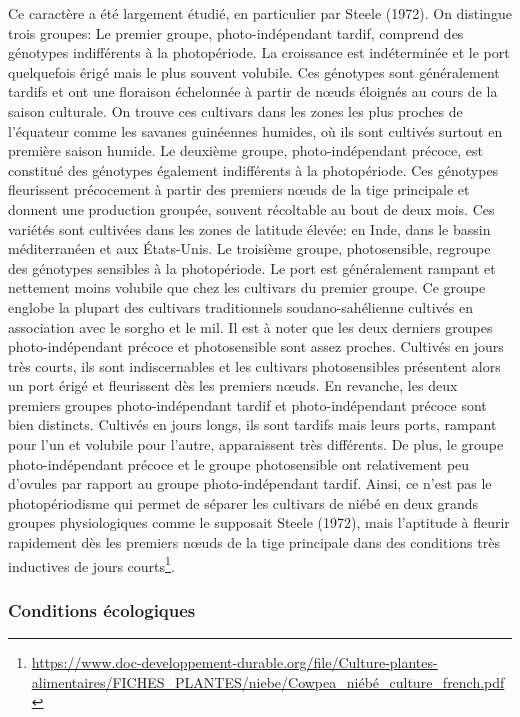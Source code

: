 \documentclass[a4paper,11pt]{article}
\begin{document}
Ce caractère a été largement étudié, en particulier par Steele
(1972). On distingue trois groupes: Le premier groupe,
photo-indépendant tardif, comprend des génotypes indifférents à la
photopériode. La croissance est indéterminée et le port quelquefois
érigé mais le plus souvent volubile. Ces génotypes sont généralement
tardifs et ont une floraison échelonnée à partir de nœuds éloignés au
cours de la saison culturale. On trouve ces cultivars dans les zones
les plus proches de l’équateur comme les savanes guinéennes humides,
où ils sont cultivés surtout en première saison humide.  Le
deuxième groupe, photo-indépendant précoce, est constitué des
génotypes également indifférents à la photopériode. Ces génotypes
fleurissent précocement à partir des premiers nœuds de la tige
principale et donnent une production groupée, souvent récoltable au
bout de deux mois. Ces variétés sont cultivées dans les zones de
latitude élevée: en Inde, dans le bassin méditerranéen et aux
États-Unis.  Le troisième groupe, photosensible, regroupe des
génotypes sensibles à la photopériode. Le port est généralement
rampant et nettement moins volubile que chez les cultivars du premier
groupe. Ce groupe englobe la plupart des cultivars traditionnels
soudano-sahélienne cultivés en association avec le sorgho et
le mil\cite{Doggett_1988}. Il est à noter que les deux derniers groupes
photo-indépendant précoce et photosensible sont assez
proches. Cultivés en jours très courts, ils sont indiscernables et les
cultivars photosensibles présentent alors un port érigé et fleurissent
dès les premiers nœuds. En revanche, les deux premiers groupes
photo-indépendant tardif et photo-indépendant précoce sont bien
distincts. Cultivés en jours longs, ils sont tardifs mais leurs ports,
rampant pour l’un et volubile pour l’autre, apparaissent très
différents. De plus, le groupe photo-indépendant précoce et le groupe
photosensible ont relativement peu d’ovules par rapport au groupe
photo-indépendant tardif. Ainsi, ce n’est pas le photopériodisme qui
permet de séparer les cultivars de niébé en deux grands groupes
physiologiques comme le supposait Steele (1972), mais l’aptitude à
fleurir rapidement dès les premiers nœuds de la tige principale dans
des conditions très inductives de jours courts\footnote{\url{https://www.doc-developpement-durable.org/file/Culture-plantes-alimentaires/FICHES_PLANTES/niebe/Cowpea_niébé_culture_french.pdf}}.

\subsubsection{Conditions écologiques}
\end{document}
